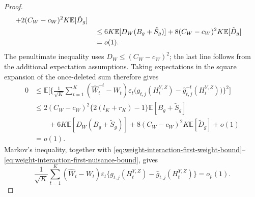 \documentclass[12pt]{article}
\def\E{\mathbb{E}}
\numberwithin{equation}{section}
\begin{document}
\begin{proof}
\begin{align}
+2(C_W-c_W)^2K\E[\tilde D_g]\notag\\
&\quad\leq
6K\E[D_W(B_g+\tilde S_g)]
+8(C_W-c_W)^2K\E[\tilde D_g]\notag\\
&\quad=o(1).
\label{eq:weight-interaction-double-difference-bound}
\end{align}
The penultimate inequality uses \(D_W\leq(C_W-c_W)^2\);
the last line follows from the additional expectation assumptions.
Taking expectations in the square expansion of the once-deleted
sum therefore gives
\begin{align*}
0
&\leq
\E\Bigg[
\Big\{\frac1{\sqrt K}\sum_{t=1}^K
(\hat W_t^{-t}-W_t)\varepsilon_t
\big(g_{t,j}(H_t^{Y,Z})
-\hat g_{t,j}^{-t}(H_t^{Y,Z})\big)
\Big\}^2
\Bigg]\\
&\leq
2(C_W-c_W)^2\{2(l_K+r_K)-1\}\E[B_g+\tilde S_g]\\
&\qquad{}+
6K\E[D_W(B_g+\tilde S_g)]
+8(C_W-c_W)^2K\E[\tilde D_g]+o(1)\\
&=o(1).
\end{align*}
Markov's inequality, together with
\eqref{eq:weight-interaction-first-weight-bound}--
\eqref{eq:weight-interaction-first-nuisance-bound}, gives
\begin{equation}
\label{eq:termVI-converge}
\frac1{\sqrt K}\sum_{t=1}^K
(\hat W_t-W_t)\varepsilon_t
\big\{g_{t,j}(H_t^{Y,Z})
-\hat g_{t,j}(H_t^{Y,Z})\big\}
=o_p(1).
\end{equation}


\end{proof}
\end{document}
